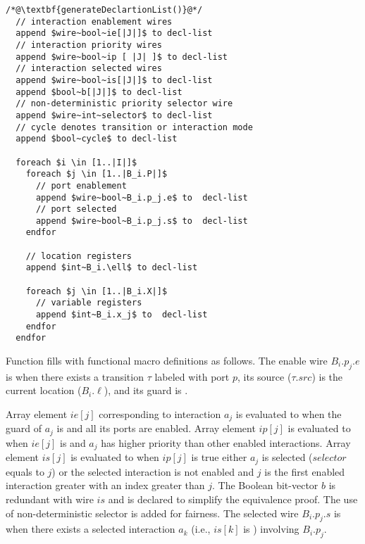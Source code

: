 \begin{lstlisting}
/*@\textbf{generateDeclartionList()}@*/
  // interaction enablement wires
  append $wire~bool~ie[|J|]$ to decl-list
  // interaction priority wires
  append $wire~bool~ip [ |J| ]$ to decl-list 
  // interaction selected wires
  append $wire~bool~is[|J|]$ to decl-list 
  append $bool~b[|J|]$ to decl-list 
  // non-deterministic priority selector wire
  append $wire~int~selector$ to decl-list 
  // cycle denotes transition or interaction mode
  append $bool~cycle$ to decl-list  

  foreach $i \in [1..|I|]$
    foreach $j \in [1..|B_i.P|]$ 
      // port enablement
      append $wire~bool~B_i.p_j.e$ to  decl-list 
      // port selected
      append $wire~bool~B_i.p_j.s$ to  decl-list 
    endfor

    // location registers
    append $int~B_i.\ell$ to decl-list
    
    foreach $j \in [1..|B_i.X|]$ 
      // variable registers
      append $int~B_i.x_j$ to  decl-list 
    endfor
  endfor
\end{lstlisting}


Function  fills  with functional macro definitions as follows. The enable wire $B_i.p_j.e$ is \true when there exists a transition $\tau$ labeled with port $p$, its source ($\tau.src$) is the current location ($B_i.\ell$), and its guard is \true. 

Array element $ie[j]$ corresponding to interaction $a_j$ is evaluated to \true when the guard of $a_j$ is \true and all its ports are enabled. Array element $ip[j]$ is evaluated to \true when $ie[j]$ is \true and $a_j$ has higher priority than other enabled interactions. 
Array element $is[j]$ is evaluated to \true when $ip[j]$ is true either $a_j$ is selected ($selector$ equals to $j$) or the selected interaction is not enabled and $j$ is the first enabled interaction greater with an index greater than $j$. 
The Boolean bit-vector $b$ is redundant with wire $is$ and is declared to simplify the equivalence proof. 
The use of non-deterministic selector is added for fairness. 
The selected wire $B_i.p_j.s$ is \true when there exists a selected interaction $a_k$ (i.e., $is[k]$ is \true) involving $B_i.p_j$.

